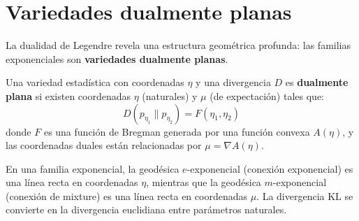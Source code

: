 \begin{center}
\end{center}

\section{Variedades dualmente planas}

La dualidad de Legendre revela una estructura geométrica profunda: las familias exponenciales son \textbf{variedades dualmente planas}.

\begin{definition}
	Una variedad estadística con coordenadas $\eta$ y una divergencia $D$ es \textbf{dualmente plana} si existen coordenadas $\eta$ (naturales) y $\mu$ (de expectación) tales que:
	\[
	D(p_{\eta_1} \| p_{\eta_2}) = F(\eta_1, \eta_2)
	\]
	donde $F$ es una función de Bregman generada por una función convexa $A(\eta)$, y las coordenadas duales están relacionadas por $\mu = \nabla A(\eta)$.
\end{definition}

\begin{proposition}
	En una familia exponencial, la geodésica $e$-exponencial (conexión exponencial) es una línea recta en coordenadas $\eta$, mientras que la geodésica $m$-exponencial (conexión de mixture) es una línea recta en coordenadas $\mu$.  La divergencia KL se convierte en la divergencia euclidiana entre parámetros naturales.
\end{proposition}

